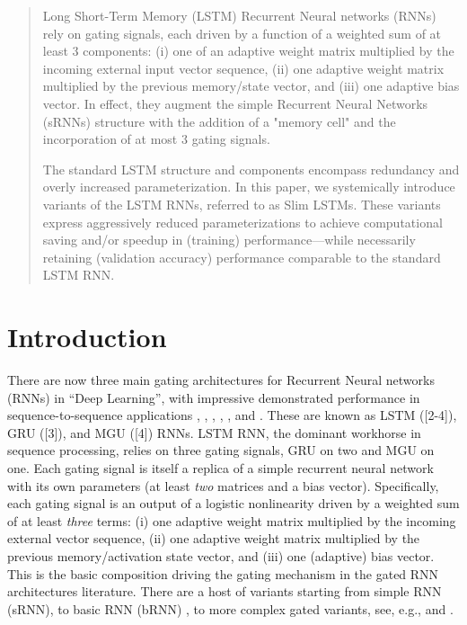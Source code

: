 \documentclass{article}
\begin{document}
\begin{abstract}
Long Short-Term Memory (LSTM) Recurrent Neural networks (RNNs) rely on gating signals, each driven by a function of a weighted sum of at least 3 components: (i) one of an adaptive weight matrix multiplied by the incoming external input vector sequence, (ii) one adaptive weight matrix multiplied by the previous memory/state vector, and (iii) one adaptive bias vector. In effect, they augment the simple Recurrent Neural Networks (sRNNs) structure with the addition of a "memory cell" and the incorporation of at most 3 gating signals.

The standard LSTM structure and components encompass redundancy and overly increased parameterization. In this paper, we systemically introduce variants of the LSTM RNNs, referred to as Slim LSTMs. These variants express aggressively reduced parameterizations to achieve computational saving and/or speedup in (training) performance---while necessarily retaining (validation accuracy) performance comparable to the standard LSTM RNN.
\end{abstract}


\section{Introduction}


There are now three main gating architectures for Recurrent Neural networks (RNNs) in “Deep Learning”, with impressive demonstrated performance in sequence-to-sequence applications \cite{DBLP:journals/corr/JohnsonSLKWCTVW16}, \cite{chung2014empirical}, \cite{gers2002learning}, \cite{hochreiter1997long}, \cite{zaremba2015empirical}, \cite{Odyssey2016} and \cite{bengio1994learning}. These are known as LSTM ([2-4]), GRU ([3]), and MGU ([4]) RNNs. LSTM RNN, the dominant workhorse in sequence processing, relies on three gating signals, GRU on two and MGU on one. Each gating signal is itself a replica of a simple recurrent neural network with its own parameters (at least \textit{two} matrices and a bias vector). Specifically, each gating signal is an output of a logistic nonlinearity driven by a weighted sum of at least \textit{three} terms: (i) one adaptive weight matrix multiplied by the incoming external vector sequence, (ii) one adaptive weight matrix multiplied by the previous memory/activation state vector, and (iii) one (adaptive) bias vector. This is the basic composition driving the gating mechanism in the gated RNN architectures literature. There are a host of variants starting from simple RNN (sRNN), to basic RNN (bRNN) \cite {salem2016basic}, to more complex gated variants, see, e.g., \cite{zaremba2015empirical} and \cite{Odyssey2016}.
\end{document}
